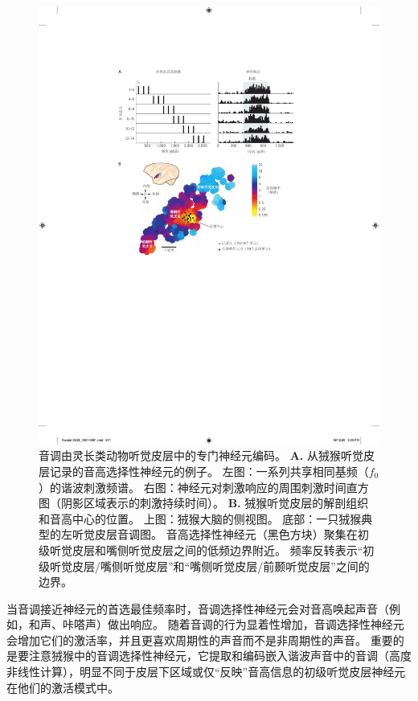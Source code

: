 \begin{figure}[htbp]
	\centering
	\includegraphics[width=0.8\linewidth]{chap28/fig_28_13}
	\caption{音调由灵长类动物听觉皮层中的专门神经元编码。
		\textbf{A.} 从狨猴听觉皮层记录的音高选择性神经元的例子。
		左图：一系列共享相同基频（$f_0$）的谐波刺激频谱。
		右图：神经元对刺激响应的周围刺激时间直方图（阴影区域表示的刺激持续时间）\cite{bendor2005neuronal}。
		\textbf{B.} 狨猴听觉皮层的解剖组织和音高中心的位置。
		上图：狨猴大脑的侧视图。
		底部：一只狨猴典型的左听觉皮层音调图。
		音高选择性神经元（黑色方块）聚集在初级听觉皮层和嘴侧听觉皮层之间的低频边界附近。
		频率反转表示“初级听觉皮层/嘴侧听觉皮层”和“嘴侧听觉皮层/前颞听觉皮层”之间的边界\cite{bendor2005neuronal}。}
	\label{fig:28_13}
\end{figure}


当音调接近神经元的首选最佳频率时，音调选择性神经元会对音高唤起声音（例如，和声、咔嗒声）做出响应。
随着音调的行为显着性增加，音调选择性神经元会增加它们的激活率，并且更喜欢周期性的声音而不是非周期性的声音。
重要的是要注意狨猴中的音调选择性神经元，它提取和编码嵌入谐波声音中的音调（高度非线性计算），明显不同于皮层下区域或仅“反映”音高信息的初级听觉皮层神经元在他们的激活模式中。


